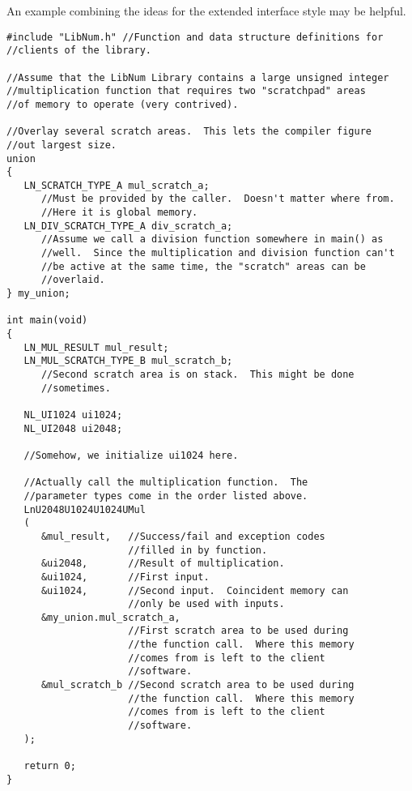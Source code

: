 An example combining the ideas for the extended interface 
style may be helpful.  

\begin{verbatim}
#include "LibNum.h" //Function and data structure definitions for //clients of the library.

//Assume that the LibNum Library contains a large unsigned integer
//multiplication function that requires two "scratchpad" areas
//of memory to operate (very contrived).

//Overlay several scratch areas.  This lets the compiler figure
//out largest size.
union
{
   LN_SCRATCH_TYPE_A mul_scratch_a;
      //Must be provided by the caller.  Doesn't matter where from.
      //Here it is global memory.
   LN_DIV_SCRATCH_TYPE_A div_scratch_a;
      //Assume we call a division function somewhere in main() as
      //well.  Since the multiplication and division function can't
      //be active at the same time, the "scratch" areas can be
      //overlaid.
} my_union;

int main(void)
{
   LN_MUL_RESULT mul_result;
   LN_MUL_SCRATCH_TYPE_B mul_scratch_b;
      //Second scratch area is on stack.  This might be done
      //sometimes.

   NL_UI1024 ui1024;
   NL_UI2048 ui2048;

   //Somehow, we initialize ui1024 here.

   //Actually call the multiplication function.  The
   //parameter types come in the order listed above.
   LnU2048U1024U1024UMul
   (
      &mul_result,   //Success/fail and exception codes
                     //filled in by function.
      &ui2048,       //Result of multiplication.
      &ui1024,       //First input.
      &ui1024,       //Second input.  Coincident memory can
                     //only be used with inputs.
      &my_union.mul_scratch_a,
                     //First scratch area to be used during
                     //the function call.  Where this memory
                     //comes from is left to the client
                     //software.
      &mul_scratch_b //Second scratch area to be used during
                     //the function call.  Where this memory
                     //comes from is left to the client
                     //software.
   );

   return 0;
}
\end{verbatim}


